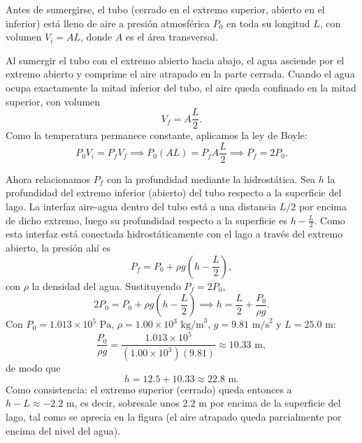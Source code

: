 \documentclass[12pt,a4paper]{article}
\newcommand{\paren}[1]{\left( #1 \right)}
\begin{document}
    \begin{solucion}
        Antes de sumergirse, el tubo (cerrado en el extremo superior, abierto en el inferior)
        está lleno de aire a presión atmosférica $P_{0}$ en toda su longitud $L$, con volumen
        $V_{i}=AL$, donde $A$ es el área transversal.

        Al sumergir el tubo con el extremo abierto hacia abajo, el agua asciende por el extremo
        abierto y comprime el aire atrapado en la parte cerrada. Cuando el agua ocupa exactamente
        la mitad inferior del tubo, el aire queda confinado en la mitad superior, con volumen
        \begin{equation*}
            V_{f}=A\frac{L}{2}.
        \end{equation*}
        Como la temperatura permanece constante, aplicamos la ley de Boyle:
        \begin{equation*}
            P_{0}V_{i}=P_{f}V_{f} \implies P_{0}(AL)=P_{f}A\frac{L}{2} \implies P_{f}=2P_{0}.
        \end{equation*}

        Ahora relacionamos $P_{f}$ con la profundidad mediante la hidrostática. Sea $h$ la
        profundidad del extremo inferior (abierto) del tubo respecto a la superficie del lago.
        La interfaz aire-agua dentro del tubo está a una distancia $L/2$ por encima de dicho
        extremo, luego su profundidad respecto a la superficie es $h-\frac{L}{2}$. Como esta
        interfaz está conectada hidrostáticamente con el lago a través del extremo abierto, la
        presión ahí es
        \begin{equation*}
            P_{f}=P_{0}+\rho g\paren{h-\frac{L}{2}},
        \end{equation*}
        con $\rho$ la densidad del agua. Sustituyendo $P_{f}=2P_{0}$,
        \begin{equation*}
            2P_{0}=P_{0}+\rho g\paren{h-\frac{L}{2}}
            \implies
            h=\frac{L}{2}+\frac{P_{0}}{\rho g}.
        \end{equation*}
        Con $P_{0}=1.013\times10^{5}\text{ Pa}$, $\rho=1.00\times10^{3}\text{ kg/m}^{3}$,
        $g=9.81\text{ m/s}^{2}$ y $L=25.0\text{ m}$:
        \begin{equation*}
            \frac{P_{0}}{\rho g}=\frac{1.013\times10^{5}}{(1.00\times10^{3})(9.81)}\approx10.33\text{ m},
        \end{equation*}
        de modo que
        \begin{equation*}
            h=12.5+10.33\approx22.8\text{ m}.
        \end{equation*}
        Como consistencia: el extremo superior (cerrado) queda entonces a $h-L\approx-2.2\text{ m}$,
        es decir, sobresale unos $2.2\text{ m}$ por encima de la superficie del lago, tal como se
        aprecia en la figura (el aire atrapado queda parcialmente por encima del nivel del agua).
    \end{solucion}
\end{document}
